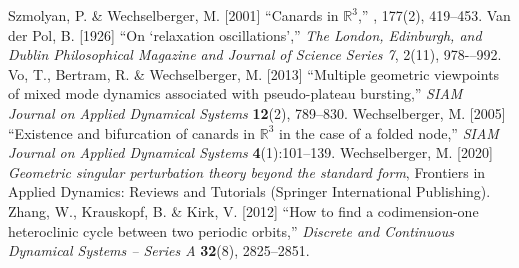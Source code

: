\documentclass{ws-ijbc}
\begin{document}
\begin{thebibliography}{46}
%
Szmolyan, P. \& Wechselberger, M. [2001]
\newblock \enquote{Canards in $\mathbb{R}^3$,}
, 177(2), 419--453.
%
Van der Pol, B. [1926]
\newblock \enquote{On `relaxation oscillations',}
\newblock \emph{The London, Edinburgh, and Dublin Philosophical Magazine and Journal of Science 
Series 7}, 2(11), 978-–992.
%
% 
Vo, T., Bertram, R. \& Wechselberger, M. [2013]
\newblock \enquote{Multiple geometric viewpoints of mixed mode dynamics associated with pseudo-plateau
  bursting,}
\newblock \emph{SIAM Journal on Applied Dynamical Systems} \textbf{12}(2), 789--830.
%
%  
%  
Wechselberger, M. [2005]
\newblock \enquote{Existence and bifurcation of canards in $\mathbb{R}^3$ in the case of a folded node,}
\newblock \emph{SIAM Journal on Applied Dynamical Systems} \textbf{4}(1):101--139.
%
Wechselberger, M. [2020]
\newblock \emph{Geometric singular perturbation theory beyond the standard form},
\newblock Frontiers in Applied Dynamics: Reviews and Tutorials (Springer International Publishing).
%
Zhang, W., Krauskopf, B. \& Kirk, V. [2012]
\newblock \enquote{How to find a codimension-one heteroclinic cycle between two periodic orbits,}
\newblock \emph{Discrete and Continuous Dynamical Systems -- Series A} \textbf{32}(8), 2825--2851.

\end{thebibliography}
\end{document}
